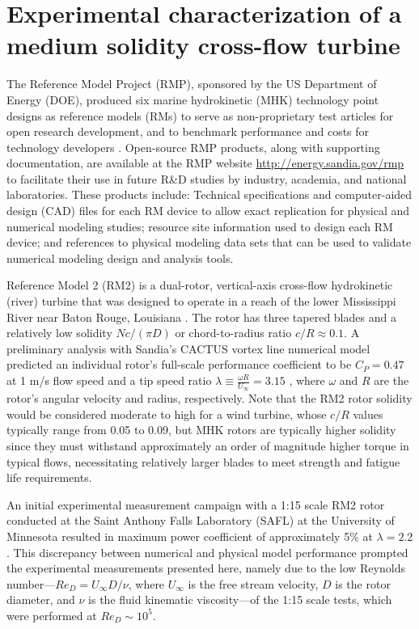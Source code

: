 \chapter{Experimental characterization of a medium solidity cross-flow turbine}
\label{chap:RM2}


The Reference Model Project (RMP), sponsored by the US Department of Energy
(DOE), produced six marine hydrokinetic (MHK) technology point designs as
reference models (RMs) to serve as non-proprietary test articles for open
research development, and to benchmark performance and costs for technology
developers \cite{Neary2014, Neary2014a}. Open-source RMP products, along with
supporting documentation, are available at the RMP website
\url{http://energy.sandia.gov/rmp} to facilitate their use in future R\&D
studies by industry, academia, and national laboratories. These products
include: Technical specifications and computer-aided design (CAD) files for each
RM device to allow exact replication for physical and numerical modeling
studies; resource site information used to design each RM device; and references
to physical modeling data sets that can be used to validate numerical modeling
design and analysis tools.

Reference Model 2 (RM2) is a dual-rotor, vertical-axis cross-flow hydrokinetic
(river) turbine that was designed to operate in a reach of the lower Mississippi
River near Baton Rouge, Louisiana \cite{Barone2011, Neary2011}. The rotor has
three tapered blades and a relatively low solidity $Nc/(\pi D)$ or
chord-to-radius ratio $c/R \approx 0.1$. A preliminary analysis with Sandia's
CACTUS vortex line numerical model \cite{Murray2011} predicted an individual
rotor's full-scale performance coefficient to be $C_P=0.47$ at 1 m/s flow speed
and a tip speed ratio $\lambda \equiv \frac{\omega R}{U_\infty} = 3.15$
\cite{Barone2011}, where $\omega$ and $R$ are the rotor's angular velocity and
radius, respectively. Note that the RM2 rotor solidity would be considered
moderate to high for a wind turbine, whose $c/R$ values typically range from
0.05 to 0.09, but MHK rotors are typically higher solidity since they must
withstand approximately an order of magnitude higher torque in typical flows,
necessitating relatively larger blades to meet strength and fatigue life
requirements.

An initial experimental measurement campaign with a 1:15 scale RM2 rotor
conducted at the Saint Anthony Falls Laboratory (SAFL) at the University of
Minnesota resulted in maximum power coefficient of approximately 5\% at $\lambda
= 2.2$ \cite{Hill2014}. This discrepancy between numerical and physical model
performance prompted the experimental measurements presented here, namely due to
the low Reynolds number---$Re_D = U_\infty D / \nu$, where $U_\infty$ is the
free stream velocity, $D$ is the rotor diameter, and $\nu$ is the fluid
kinematic viscosity---of the 1:15 scale tests, which were performed at $Re_D
\sim 10^5$.

